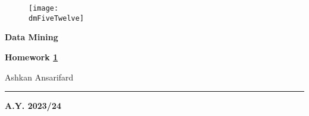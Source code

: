 \geometry{
	a4paper, %
	left=2cm, %
	right=2cm, %
	top=2.5cm, %
	bottom=2.5cm %
}




	
	\begin{center}
		\begin{figure}[h]
			\centering
			\texttt{[image: \\dmFiveTwelve]}
		\end{figure}
		\vspace{1cm} 
		{\fontsize{28}{34}\selectfont \textbf{Data Mining}}
	\end{center}

	\vspace{1cm} 
	
	\begin{center}
	{\fontsize{22}{28}\selectfont \textbf{Homework \underline{1}}}
	\end{center}

	\vspace{1cm} 

	\begin{center}
	{\fontsize{22}{28}\selectfont Ashkan Ansarifard}
	\end{center}

	\vspace{0.5cm} 
	
	\begin{center}
	{\fontsize{22}{28}}
	\end{center}

	\vspace{1cm} 
	
	\textcolor{blue!60!black}{\rule{\linewidth}{2pt}}
	
	\vspace{5cm} 
	
	\begin{center}
	\textbf{A.Y. 2023/24}
	\end{center}

	\thispagestyle{empty}
	
	\newpage
	
	\myTOC

